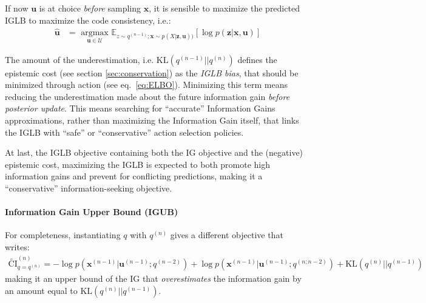 \documentclass[12pt,twoside,openright]{article}
\begin{document}
If now $\boldsymbol{u}$ is at choice \emph{before} sampling  $\boldsymbol{x}$, it is sensible to maximize the predicted IGLB to maximize the code consistency, i.e.:
\begin{align}
	\hat{\boldsymbol{u}} 
	&= \underset{\boldsymbol{u} \in \mathcal{U}}{\text{ argmax }} \mathbb{E}_{z\sim q^{(n-1)}; \boldsymbol{x}\sim p(X|\boldsymbol{z},\boldsymbol{u}))} 
	\left[\log p(\boldsymbol{z}|\boldsymbol{x}, \boldsymbol{u})\right]\label{eq:LC-pred}
\end{align}

The amount of the underestimation,  i.e. $\text{KL} (q^{(n-1)}||q^{(n)})$ defines the epistemic cost (see section \ref{sec:conservation}) as the \emph{IGLB bias}, that should be minimized through action (see eq.~\ref{eq:ELBO}).  Minimizing this term means reducing the underestimation made about the future information gain \emph{before posterior update}. This means searching for ``accurate'' Information Gains approximations, rather than maximizing the Information Gain itself, that links the IGLB with ``safe'' or ``conservative'' action selection policies. 

At last, the IGLB objective containing both the IG objective and the (negative) epistemic cost, maximizing the IGLB is expected to both promote high information gains and prevent for conflicting predictions, making it a ``conservative'' information-seeking objective.

\paragraph{Information Gain Upper Bound (IGUB)}
For completeness,  instantiating $q$ with $q^{(n)}$ gives a different objective  that writes:
\begin{align}
	\tilde{\text{CI}}^{(n)}_{q = q^{(n)}} = 
	-\log p(\boldsymbol{x}^{(n-1)}|\boldsymbol{u}^{(n-1)}; q^{(n-2)}) 
	+ \log p(\boldsymbol{x}^{(n-1)}|\boldsymbol{u}^{(n-1)}; q^{(n;n-2)}) + \text{KL} (q^{(n)}||q^{(n-1)})
\end{align}
making it an upper bound of the IG that \emph{overestimates} the information gain by an amount equal to $\text{KL} (q^{(n)}||q^{(n-1)})$. 
\end{document}
